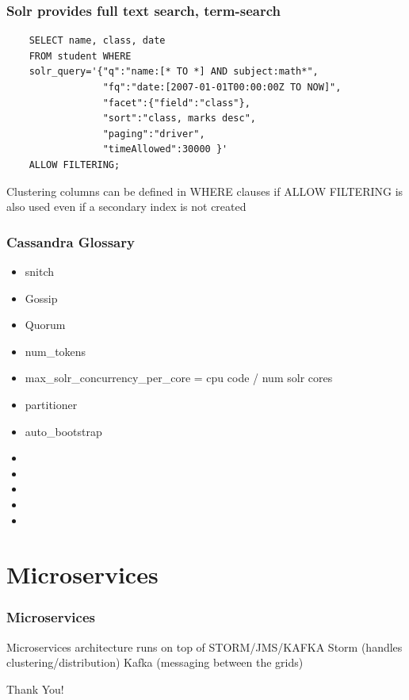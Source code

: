 \documentclass{beamer}
\begin{document}

\begin{frame}[fragile]
\frametitle{Solr provides full text search, term-search}
\begin{example}
	\begin{verbatim}	
	SELECT name, class, date
	FROM student WHERE 
	solr_query='{"q":"name:[* TO *] AND subject:math*",
	             "fq":"date:[2007-01-01T00:00:00Z TO NOW]",
	             "facet":{"field":"class"},
	             "sort":"class, marks desc", 
	             "paging":"driver", 
	             "timeAllowed":30000 }'
	ALLOW FILTERING;
	\end{verbatim}

\end{example}

Clustering columns can be defined in WHERE clauses if ALLOW FILTERING is also used even if a secondary index is not created

\end{frame}


\begin{frame}
\frametitle{Cassandra Glossary}
\begin{itemize}
	\item snitch
	\item Gossip
	\item Quorum
	\item num\_tokens
	\item max\_solr\_concurrency\_per\_core = cpu code / num solr cores
	\item partitioner
	\item auto\_bootstrap  
	\item 
	\item 
	\item 
	\item 
	\item 
\end{itemize}
\end{frame}


\section{Microservices}

\begin{frame}
	\frametitle{Microservices}
	Microservices architecture runs on top of STORM/JMS/KAFKA \newline
	Storm (handles clustering/distribution) \newline
	Kafka (messaging between the grids) \newline \\
\end{frame}

\begin{frame}
\Huge{\centerline{Thank You!}}
\end{frame}

\end{document}
